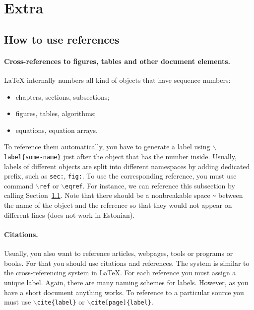 \documentclass[12pt]{article}
\begin{document}
\newpage
\section{Extra}
\subsection{How to use references} \label{sec:using_ref}

\paragraph{Cross-references to figures, tables and other document elements.}
LaTeX  internally numbers all kind of objects that have sequence numbers:
\begin{itemize}
\item chapters, sections, subsections;
\item figures, tables, algorithms;
\item equations, equation arrays.
\end{itemize}
To reference them automatically, you have to generate a label using \texttt{$\backslash$label\{some-name\}} just after the object that has the number inside. Usually, labels of different objects are split into different namespaces by adding dedicated prefix, such as \texttt{sec:}, \texttt{fig:}. To use the corresponding reference, you must use command \texttt{$\backslash$ref} or \texttt{$\backslash$eqref}. For instance, we can reference this subsection by calling Section~\ref{sec:using_ref}. Note that there should be a nonbreakable space \texttt{\~} between the name of the object and the reference so that they would not appear on different lines (does not work in Estonian).          


\paragraph{Citations.}
Usually, you also want to reference articles, webpages, tools or programs or books. For that you should use citations and references. The system is similar to the cross-referencing system in LaTeX. For each reference you must assign a unique label. Again, there are many naming schemes for labels. However, as you have a short document anything works. To reference to a particular source you must use \texttt{$\backslash$cite\{label\}} or \texttt{$\backslash$cite[page]\{label\}}. 
\end{document}
